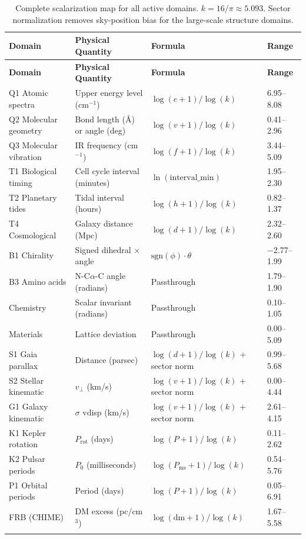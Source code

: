 \documentclass[11pt, letterpaper, openany]{book}
\begin{document}
\begin{longtable}{|p{}|p{}|p{}|p{}|}
\hline
\textbf{Domain} & \textbf{Physical Quantity} & \textbf{Formula} & \textbf{Range} \\
\hline\hline
\endfirsthead
\hline
\textbf{Domain} & \textbf{Physical Quantity} & \textbf{Formula} & \textbf{Range} \\
\hline\hline
\endhead
Q1 Atomic spectra & Upper energy level (cm$^{-1}$) & $\log(e+1)/\log(k)$ & 6.95--8.08 \\
Q2 Molecular geometry & Bond length (\AA) or angle (deg) & $\log(v+1)/\log(k)$ & 0.41--2.96 \\
Q3 Molecular vibration & IR frequency (cm$^{-1}$) & $\log(f+1)/\log(k)$ & 3.44--5.09 \\
T1 Biological timing & Cell cycle interval (minutes) & $\ln(\text{interval\_min})$ & 1.95--2.30 \\
T2 Planetary tides & Tidal interval (hours) & $\log(h+1)/\log(k)$ & 0.82--1.37 \\
T4 Cosmological & Galaxy distance (Mpc) & $\log(d+1)/\log(k)$ & 2.32--2.60 \\
B1 Chirality & Signed dihedral $\times$ angle & $\text{sgn}(\phi) \cdot \theta$ & $-$2.77--1.99 \\
B3 Amino acids & N-C$\alpha$-C angle (radians) & Passthrough & 1.79--1.90 \\
Chemistry & Scalar invariant (radians) & Passthrough & 0.10--1.05 \\
Materials & Lattice deviation & Passthrough & 0.00--5.09 \\
S1 Gaia parallax & Distance (parsec) & $\log(d+1)/\log(k)$ + sector norm & 0.99--5.68 \\
S2 Stellar kinematic & $v_\perp$ (km/s) & $\log(v+1)/\log(k)$ + sector norm & 0.00--4.44 \\
G1 Galaxy kinematic & $\sigma$ vdisp (km/s) & $\log(v+1)/\log(k)$ + sector norm & 2.61--4.15 \\
K1 Kepler rotation & $P_\text{rot}$ (days) & $\log(P+1)/\log(k)$ & 0.11--2.62 \\
K2 Pulsar periods & $P_0$ (milliseconds) & $\log(P_\text{ms}+1)/\log(k)$ & 0.54--5.76 \\
P1 Orbital periods & Period (days) & $\log(P+1)/\log(k)$ & 0.05--6.91 \\
FRB (CHIME) & DM excess (pc/cm$^3$) & $\log(\text{dm}+1)/\log(k)$ & 1.67--5.58 \\
\hline
\caption{Complete scalarization map for all active domains. $k = 16/\pi \approx 5.093$. Sector normalization removes sky-position bias for the large-scale structure domains.}
\label{tab:scalarization}
\end{longtable}
\end{document}
